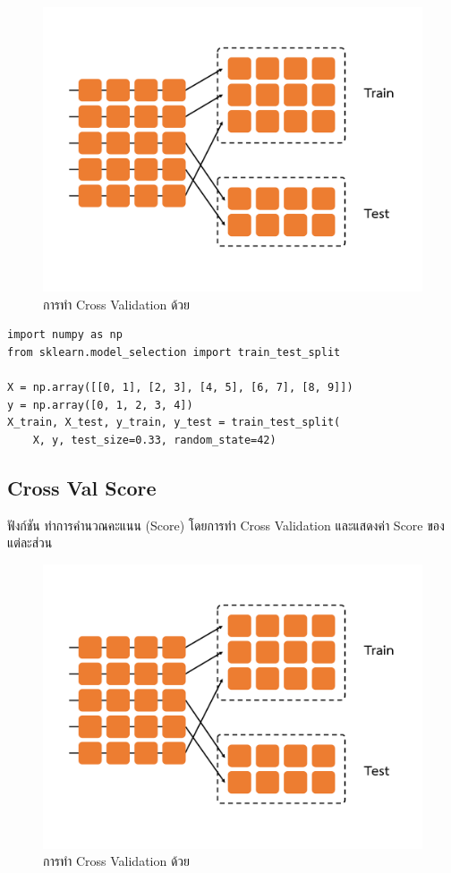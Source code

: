 \begin{figure}[H]
    \centering
    \includegraphics[width=0.9\linewidth,page=1]{fig/cross_validation.pdf}
    \caption{การทำ Cross Validation ด้วย }
    \label{fig:train_test_split}
\end{figure}

\begin{lstlisting}[style=MyPython]
import numpy as np
from sklearn.model_selection import train_test_split

X = np.array([[0, 1], [2, 3], [4, 5], [6, 7], [8, 9]])
y = np.array([0, 1, 2, 3, 4])
X_train, X_test, y_train, y_test = train_test_split(
    X, y, test_size=0.33, random_state=42)
\end{lstlisting}

\subsection{Cross Val Score}
\label{ssec:cross_val_score}

ฟังก์ชัน  ทำการคำนวณคะแนน (Score) โดยการทำ Cross Validation และแสดงค่า Score ของแต่ละส่วน

\begin{figure}[H]
    \centering
    \includegraphics[width=0.9\linewidth,page=2]{fig/cross_validation.pdf}
    \caption{การทำ Cross Validation ด้วย }
    \label{fig:cross_val_score}
\end{figure}


